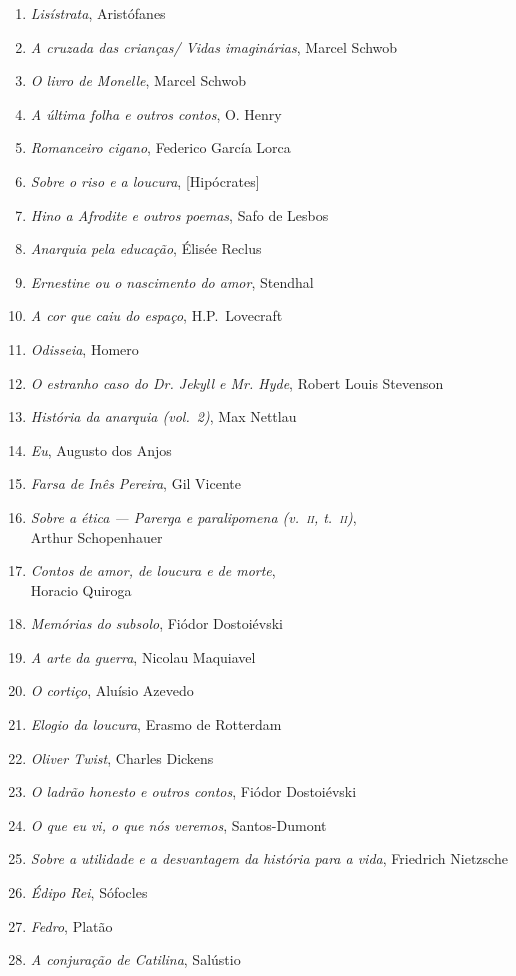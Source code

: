 \begin{enumerate}
\item \textit{Lisístrata}, Aristófanes 
\item \textit{A cruzada das crianças/ Vidas imaginárias}, Marcel Schwob
\item \textit{O livro de Monelle}, Marcel Schwob
\item \textit{A última folha e outros contos}, O. Henry
\item \textit{Romanceiro cigano}, Federico García Lorca
\item \textit{Sobre o riso e a loucura}, [Hipócrates]
\item \textit{Hino a Afrodite e outros poemas}, Safo de Lesbos 
\item \textit{Anarquia pela educação}, Élisée Reclus 
\item \textit{Ernestine ou o nascimento do amor}, Stendhal
\item \textit{A cor que caiu do espaço}, H.P.~Lovecraft
\item \textit{Odisseia}, Homero
\item \textit{O estranho caso do Dr. Jekyll e Mr. Hyde}, Robert Louis Stevenson
\item \textit{História da anarquia (vol.~2)}, Max Nettlau
\item \textit{Eu}, Augusto dos Anjos
\item \textit{Farsa de Inês Pereira}, Gil Vicente
\item \textit{Sobre a ética --- Parerga e paralipomena (v.~\textsc{ii}, t.~\textsc{ii})},\\ Arthur Schopenhauer 
\item \textit{Contos de amor, de loucura e de morte},\\ Horacio Quiroga
\item \textit{Memórias do subsolo}, Fiódor Dostoiévski
\item \textit{A arte da guerra}, Nicolau Maquiavel
\item \textit{O cortiço}, Aluísio Azevedo
\item \textit{Elogio da loucura}, Erasmo de Rotterdam
\item \textit{Oliver Twist}, Charles Dickens
\item \textit{O ladrão honesto e outros contos}, Fiódor Dostoiévski
\item \textit{O que eu vi, o que nós veremos}, Santos-Dumont
\item \textit{Sobre a utilidade e a desvantagem da história para a vida}, Friedrich Nietzsche
\item \textit{Édipo Rei}, Sófocles
\item \textit{Fedro}, Platão
\item \textit{A conjuração de Catilina}, Salústio
\end{enumerate}\medskip


